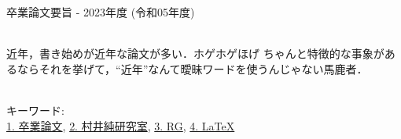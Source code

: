 卒業論文要旨 - 2023年度 (令和05年度)
\begin{center}
\begin{large}
\end{large}
\end{center}

~ \\

近年，書き始めが近年な論文が多い．ホゲホゲほげ
ちゃんと特徴的な事象があるならそれを挙げて，``近年''なんて曖昧ワードを使うんじゃない馬鹿者．

~ \\
キーワード:\\
\underline{1. 卒業論文},
\underline{2. 村井純研究室},
\underline{3. RG},
\underline{4. LaTeX}
\begin{flushright}
\dept \\
\author
\end{flushright}

